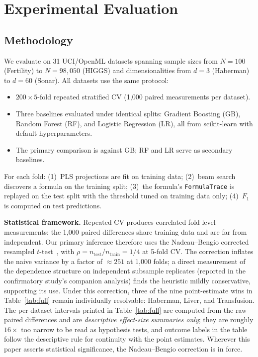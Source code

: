 \documentclass[journal]{IEEEtran}
\begin{document}
\section{Experimental Evaluation}
\label{sec:eval}

\subsection{Methodology}
\label{sec:methodology}

We evaluate on 31 UCI/OpenML datasets spanning sample sizes from
$N = 100$ (Fertility) to $N = 98{,}050$ (HIGGS) and
dimensionalities from $d = 3$ (Haberman) to $d = 60$ (Sonar).
All datasets use the same protocol:

\begin{itemize}
\item $200 \times 5$-fold repeated stratified CV (1{,}000 paired
measurements per dataset).
\item Three baselines evaluated under identical splits: Gradient
Boosting (GB), Random Forest (RF), and Logistic Regression (LR),
all from scikit-learn with default hyperparameters.
\item The primary comparison is against GB; RF and LR serve as
secondary baselines.
\end{itemize}

For each fold: (1)~PLS projections are fit on training data;
(2)~beam search discovers a formula on the training split;
(3)~the formula's \texttt{FormulaTrace} is replayed on the test
split with the threshold tuned on training data only;
(4)~$F_1$ is computed on test predictions.

\textbf{Statistical framework.}
Repeated CV produces correlated fold-level measurements: the
1{,}000 paired differences share training data and are far from
independent.  Our primary inference therefore uses the
Nadeau--Bengio corrected resampled
$t$-test~\cite{nadeau2003inference}, with
$\rho = n_{\mathrm{test}}/n_{\mathrm{train}} = 1/4$ at 5-fold
CV.  The correction inflates the naive variance by a factor of
$\approx 251$ at 1{,}000 folds; a direct measurement of the
dependence structure on independent subsample replicates (reported
in the confirmatory study's companion analysis) finds the
heuristic mildly conservative, supporting its use.  Under this
correction, three of the nine point-estimate wins in
Table~\ref{tab:full} remain individually resolvable: Haberman,
Liver, and Transfusion.  The per-dataset intervals printed in
Table~\ref{tab:full} are computed from the raw paired differences
and are \emph{descriptive effect-size summaries only}; they are
roughly $16\times$ too narrow to be read as hypothesis tests, and
outcome labels in the table follow the descriptive rule for
continuity with the point estimates.  Wherever this paper asserts
statistical significance, the Nadeau--Bengio correction is in
force.
\end{document}
